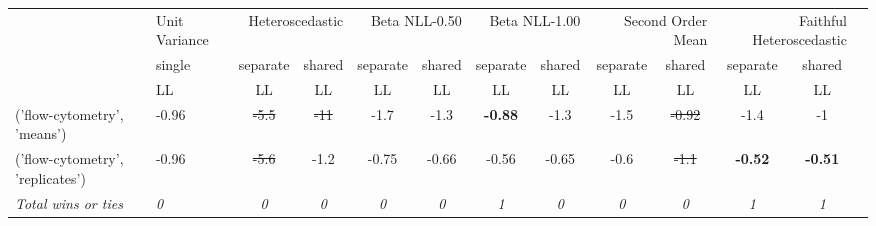 \begin{tabular}{ll|c|cc|cc|cc|cc|cc}
\toprule
{} & {Unit Variance} & \multicolumn{2}{r}{Heteroscedastic} & \multicolumn{2}{r}{Beta NLL-0.50} & \multicolumn{2}{r}{Beta NLL-1.00} & \multicolumn{2}{r}{Second Order Mean} & \multicolumn{2}{r}{Faithful Heteroscedastic} \\
{} & {single} & {separate} & {shared} & {separate} & {shared} & {separate} & {shared} & {separate} & {shared} & {separate} & {shared} \\
{} & {LL} & {LL} & {LL} & {LL} & {LL} & {LL} & {LL} & {LL} & {LL} & {LL} & {LL} \\
\midrule
('flow-cytometry', 'means') & -0.96 & \sout{-5.5} & \sout{-11} & -1.7 & -1.3 & \textbf{-0.88} & -1.3 & -1.5 & \sout{-0.92} & -1.4 & -1 \\
('flow-cytometry', 'replicates') & -0.96 & \sout{-5.6} & -1.2 & -0.75 & -0.66 & -0.56 & -0.65 & -0.6 & \sout{-1.1} & \textbf{-0.52} & \textbf{-0.51} \\
\textit{{Total wins or ties}} & \textit{0} & \textit{0} & \textit{0} & \textit{0} & \textit{0} & \textit{1} & \textit{0} & \textit{0} & \textit{0} & \textit{1} & \textit{1} \\
\bottomrule
\end{tabular}

